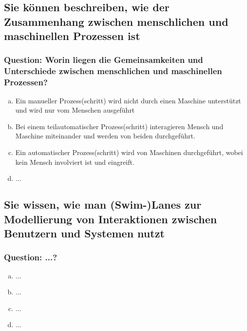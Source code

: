 \documentclass{article}
\begin{document}
\begin{adjustwidth}{2em}{2em}
\begin{adjustwidth}{2em}{2em}
			\subsection{Sie können beschreiben, wie der Zusammenhang zwischen menschlichen und maschinellen Prozessen ist}
			\begin{adjustwidth}{1em}{}
				\subsubsection*{Question: Worin liegen die Gemeinsamkeiten und Unterschiede zwischen menschlichen und maschinellen Prozessen?}
				\begin{adjustwidth}{1em}{}
					\begin{enumerate}[(a)]
						\item Ein manueller Prozess(schritt) wird nicht durch einen Maschine unterstützt und wird nur vom Menschen ausgeführt
						\item Bei einem teilautomatischer Prozess(schritt) interagieren Mensch und Maschine miteinander und werden von beiden durchgeführt.
						\item Ein automatischer Prozess(schritt) wird von Maschinen durchgeführt, wobei kein Mensch involviert ist und eingreift.
						\item ...
					\end{enumerate}
				\end{adjustwidth}
			\end{adjustwidth}
			\subsection{Sie wissen, wie man (Swim-)Lanes zur Modellierung von Interaktionen zwischen Benutzern und Systemen nutzt}
			\begin{adjustwidth}{1em}{}
				\subsubsection*{Question: ...?}
				\begin{adjustwidth}{1em}{}
					\begin{enumerate}[(a)]
						\item ...
						\item ...
						\item ...
						\item ...
					\end{enumerate}
				\end{adjustwidth}
			\end{adjustwidth}

\end{adjustwidth}
\end{adjustwidth}
\end{document}
